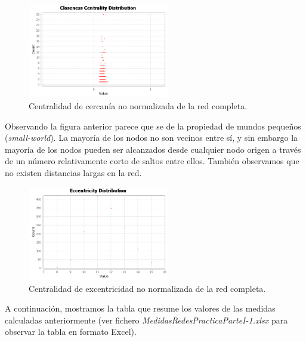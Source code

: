 \documentclass{uimppracticas}
\begin{document}
\begin{figure}[H]
	\centering
	\includegraphics[width=0.55\textwidth]{images/Closeness-Centrality-Distribution}
	\caption{Centralidad de cercanía no normalizada de la red completa.}
	\label{Closeness-Centrality-Distribution}
\end{figure}

Observando la figura anterior parece que se de la propiedad de mundos pequeños (\textit{small-world}). La mayoría de los nodos no son vecinos entre sí, y sin embargo la mayoría de los nodos pueden ser alcanzados desde cualquier nodo origen a través de un número relativamente corto de saltos entre ellos. También observamos que no existen distancias largas en la red.

\begin{figure}[H]
	\centering
	\includegraphics[width=0.55\textwidth]{images/Eccentricity-Distribution}
	\caption{Centralidad de excentricidad no normalizada de la red completa.}
	\label{Eccentricity-Distribution}
\end{figure}

A continuación, mostramos la tabla que resume los valores de las medidas calculadas anteriormente (ver fichero \textit{MedidasRedesPracticaParteI-1.xlsx} para observar la tabla en formato Excel).
\end{document}

